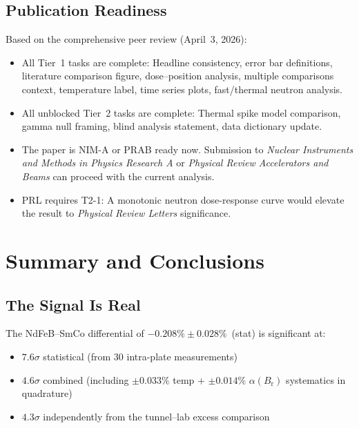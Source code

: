 \documentclass[11pt,letterpaper]{article}
\newcommand{\Br}{B_\mathrm{r}}
\newcommand{\alphar}{\alpha(\Br)}
\begin{document}
\subsection{Publication Readiness}

Based on the comprehensive peer review (April~3, 2026):

\begin{itemize}
    \item All Tier~1 tasks are complete: Headline consistency, error
    bar definitions, literature comparison figure, dose--position analysis,
    multiple comparisons context, temperature label, time series plots,
    fast/thermal neutron analysis.

    \item All unblocked Tier~2 tasks are complete: Thermal spike
    model comparison, gamma null framing, blind analysis statement, data
    dictionary update.

    \item The paper is NIM-A or PRAB ready now. Submission to
    \textit{Nuclear Instruments and Methods in Physics Research A} or
    \textit{Physical Review Accelerators and Beams} can proceed with the
    current analysis.

    \item PRL requires T2-1: A monotonic neutron dose-response curve
    would elevate the result to \textit{Physical Review Letters} significance.
\end{itemize}

\section{Summary and Conclusions}
\label{sec:conclusions}

\subsection{The Signal Is Real}

The NdFeB--SmCo differential of $-0.208\% \pm 0.028\%$~(stat) is significant
at:
\begin{itemize}
    \item $7.6\sigma$ statistical (from 30 intra-plate measurements)
    \item $4.6\sigma$ combined (including $\pm 0.033\%$ temp +
    $\pm 0.014\%$ $\alphar$ systematics in quadrature)
    \item $4.3\sigma$ independently from the tunnel--lab excess
    comparison
\end{itemize}
\end{document}
